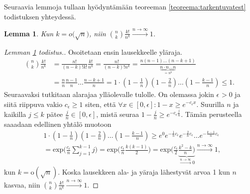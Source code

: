 \documentclass[finnish,12pt,a4paper,pdftex,sci,utf8]{aaltothesis}
\newtheorem{lemma}{Lemma}
\begin{document}
Seuraavia lemmoja tullaan hyödyntämään teoreeman \ref{teoreema:tarkentuvatest} todistuksen yhteydessä.
\begin{lemma}
	\label{lemma:kombinaatiokertoma_nk}
	Kun $k = o\big(\sqrt{n}\big)$, niin $\binom{n}{k}\frac{k!}{n^{k}} \xrightarrow{n \to \infty} 1$.
\end{lemma}
\begin{proof}[Lemman \ref{lemma:kombinaatiokertoma_nk} todistus.]
	Osoitetaan ensin lausekkeelle yläraja.
	\begin{align*}
		\binom{n}{k}\frac{k!}{n^{k}} &= \frac{n!}{(n-k)!k!} \frac{k!}{n^k} = \frac{n!}{(n-k)!n^k} = \frac{n (n-1) \ldots (n-k+1)}{\underbrace{n \cdot n \ldots n}_{=n^k}}  \\ &= \frac{n}{n} \frac{n-1}{n} \ldots \frac{n-k+1}{n} = 1 \cdot (1 -\frac{1}{n}) (1-\frac{2}{n}) \ldots (1 - \frac{k-1}{n}) \leq 1.
	\end{align*}
	Seuraavaksi tutkitaan alarajaa ylläolevalle tulolle. On olemassa jokin $\epsilon_{}^{} > 0$ ja siitä riippuva vakio $c_{\epsilon} \geq 1$ siten, että $\forall x \in [0, \epsilon] : 1-x \geq e^{-c_{\epsilon}x}$. Suurilla $n$ ja kaikilla $j \leq k$ pätee $\frac{j}{n} \in [0, \epsilon]$, mistä seuraa $1 - \frac{j}{n} \geq e^{-c_{\epsilon} \frac{j}{n}}$. Tämän perusteella saaadaan edellinen yhtälö muotoon
	\begin{align*}
		&1 \cdot (1 -\frac{1}{n}) (1-\frac{2}{n}) \ldots (1 - \frac{k-1}{n}) \geq e^0 e^{-\frac{1}{n}c{_\epsilon}} e^{-\frac{2}{n}c{_\epsilon}} \ldots e^{-\frac{k-1}{n}c{_\epsilon}} \\
		&= \text{exp}\big(\frac{c{_\epsilon}}{n} \sum_{j=1}^{k-1} j \big) = \text{exp}\big(\frac{c{_\epsilon}}{n} \frac{k(k-1)}{2} \big) = \text{exp}\big(\frac{c{_\epsilon}}{2} \underbrace{\frac{k^2 - k}{n} \big)}_{\xrightarrow{n \rightarrow \infty}0}  \xrightarrow{n \rightarrow \infty} 1,
	\end{align*}
	kun $k = \text{o}(\sqrt{n})$. Koska lausekkeen ala- ja yäraja lähestyvät arvoa 1 kun $n$ kasvaa, niin $\binom{n}{k}\frac{k!}{n^{k}} \xrightarrow{n \to \infty} 1$.
\end{proof}
\end{document}
